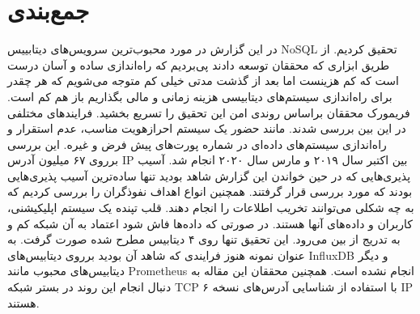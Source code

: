 \documentclass[10pt, a4paper]{article}
\begin{document}
\section{جمع‌بندی}

در این گزارش در مورد محبوب‌ترین سرویس‌های دیتابییس NoSQL تحقیق کردیم. از طریق
ابزاری که محققان توسعه دادند پی‌بردیم که راه‌اندازی ساده و آسان درست است که کم
هزینست اما بعد از گذشت مدتی خیلی کم متوجه می‌شویم که هر چقدر برای راه‌اندازی
سیستم‌های دیتابیسی هزینه زمانی و مالی بگذاریم باز هم کم است. فریمورک محققان
براساس روندی امن این تحقیق را تسریع بخشید. فرایند‌های مختلفی در این بین بررسی
شدند. مانند حضور یک سیستم احرازهویت مناسب، عدم استقرار و راه‌اندازی سیستم‌های
داده‌ای در شماره پورت‌های پیش فرض و غیره. این بررسی برروی ۶۷ میلیون آدرس IP بین
اکتبر سال ۲۰۱۹ و مارس سال ۲۰۲۰ انجام شد. آسیب پذیری‌هایی که در حین خواندن این
گزارش شاهد بودید تنها ساده‌ترین آسیب پذیری‌هایی بودند که مورد بررسی قرار گرفتند.
همچنین انواع اهداف نفوذگران را بررسی کردیم که به چه شکلی می‌توانند تخریب اطلاعات
را انجام دهند. قلب تپنده یک سیستم اپلیکیشنی، کاربران و داده‌های آنها هستند. در
صورتی که داده‌ها فاش شود اعتماد به آن شبکه کم و به تدریج از بین می‌رود. این
تحقیق تنها روی ۴ دیتابیس مطرح شده صورت گرفت. به عنوان نمونه هنوز فرایندی که شاهد
آن بودید برروی دیتابیس‌های InfluxDB و دیگر دیتابیس‌های محبوب مانند Prometheus
انجام نشده است. همچنین محققان این مقاله به دنبال انجام این روند در بستر شبکه TCP
با استفاده از شناسایی آدرس‌های نسخه ۶ IP هستند.



\end{document}
